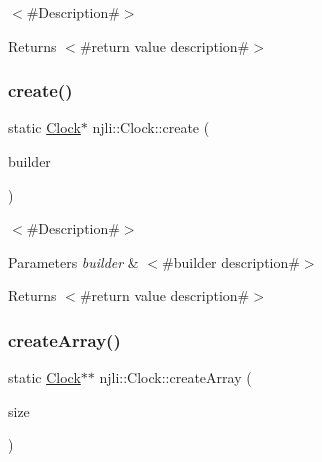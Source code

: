 $<$\#\+Description\#$>$

\begin{DoxyReturn}{Returns}
$<$\#return value description\#$>$ 
\end{DoxyReturn}
\mbox{\label{classnjli_1_1_clock_a3cab98e8e835a0a113b8211846356c76}} 
\subsubsection{\texorpdfstring{create()}{create()}\hspace{0.1cm}{\footnotesize\ttfamily [3/3]}}
{\footnotesize\ttfamily static \mbox{\hyperlink{classnjli_1_1_clock}{Clock}}$\ast$ njli\+::\+Clock\+::create (\begin{DoxyParamCaption}\item[{const \mbox{\hyperlink{classnjli_1_1_clock_builder}{Clock\+Builder}} \&}]{builder }\end{DoxyParamCaption})\hspace{0.3cm}{\ttfamily [static]}}

$<$\#\+Description\#$>$


\begin{DoxyParams}{Parameters}
{\em builder} & $<$\#builder description\#$>$\\
\hline
\end{DoxyParams}
\begin{DoxyReturn}{Returns}
$<$\#return value description\#$>$ 
\end{DoxyReturn}
\mbox{\label{classnjli_1_1_clock_a0cb02d4753cddc5aa00236c2f37f66f3}} 
\subsubsection{\texorpdfstring{create\+Array()}{createArray()}}
{\footnotesize\ttfamily static \mbox{\hyperlink{classnjli_1_1_clock}{Clock}}$\ast$$\ast$ njli\+::\+Clock\+::create\+Array (\begin{DoxyParamCaption}\item[{const \mbox{\hyperlink{_util_8h_a10e94b422ef0c20dcdec20d31a1f5049}{u32}}}]{size }\end{DoxyParamCaption})\hspace{0.3cm}{\ttfamily [static]}}

